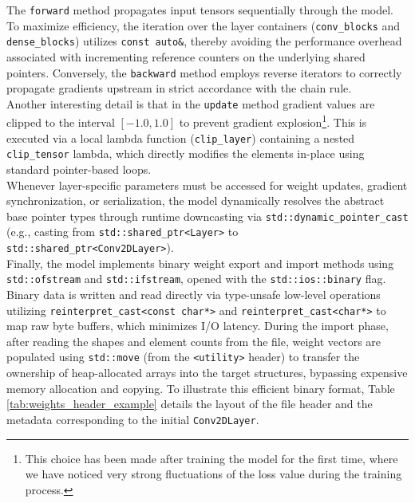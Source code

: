 The \texttt{forward} method propagates input tensors sequentially through the model. To maximize efficiency, the iteration over the layer containers (\texttt{conv\_blocks} and \texttt{dense\_blocks}) utilizes \texttt{const auto\&}, thereby avoiding the performance overhead associated with incrementing reference counters on the underlying shared pointers. Conversely, the \texttt{backward} method employs reverse iterators to correctly propagate gradients upstream in strict accordance with the chain rule.\\

Another interesting detail is that in the \texttt{update} method gradient values are clipped to the interval $[-1.0, 1.0]$ to prevent gradient explosion\footnote{This choice has been made after training the model for the first time, where we have noticed very strong fluctuations of the loss value during the training process.}. This is executed via a local lambda function (\texttt{clip\_layer}) containing a nested \texttt{clip\_tensor} lambda, which directly modifies the elements in-place using standard pointer-based loops. \\

Whenever layer-specific parameters must be accessed for weight updates, gradient synchronization, or serialization, the model dynamically resolves the abstract base pointer types through runtime downcasting via \texttt{std::dynamic\_pointer\_cast} (e.g., casting from \texttt{std::shared\_ptr<Layer>} to \texttt{std::shared\_ptr<Conv2DLayer>}).\\

Finally, the model implements binary weight export and import methods using \texttt{std::ofstream} and \texttt{std::ifstream}, opened with the \texttt{std::ios::binary} flag. Binary data is written and read directly via type-unsafe low-level operations utilizing \texttt{reinterpret\_cast<const char*>} and \texttt{reinterpret\_cast<char*>} to map raw byte buffers, which minimizes I/O latency. During the import phase, after reading the shapes and element counts from the file, weight vectors are populated using \texttt{std::move} (from the \texttt{<utility>} header) to transfer the ownership of heap-allocated arrays into the target structures, bypassing expensive memory allocation and copying. To illustrate this efficient binary format, Table \ref{tab:weights_header_example} details the layout of the file header and the metadata corresponding to the initial \texttt{Conv2DLayer}.

